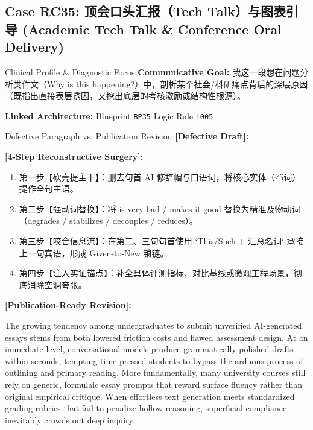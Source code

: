 \subsection{Case RC35: 顶会口头汇报（Tech Talk）与图表引导 (Academic Tech Talk \& Conference Oral Delivery)}\label{case:RC35}
\begin{ConceptBox}{Clinical Profile \& Diagnostic Focus}
\textbf{Communicative Goal:} 我这一段想在问题分析类作文（Why is this happening?）中，剖析某个社会/科研痛点背后的深层原因（既指出直接表层诱因，又挖出底层的考核激励或结构性根源）。\par
\textbf{Linked Architecture:} Blueprint \texttt{BP35} \enspace\textbar\enspace Logic Rule \texttt{L005}
\end{ConceptBox}
\begin{ExampleBox}{Defective Paragraph vs. Publication Revision}
\textbf{\color{TargetHighlight}[Defective Draft]:}\par
{}\par\vspace{6pt}
\textbf{\color{AcadForest}[4-Step Reconstructive Surgery]:}
\begin{enumerate}[label=\textbf{\color{AcadNavy}Step \arabic*:}, leftmargin=2em]
  \item 第一步【砍壳提主干】：删去句首 AI 修辞帽与口语词，将核心实体（≤5词）提作全句主语。
  \item 第二步【强动词替换】：将 is very bad / makes it good 替换为精准及物动词（degrades / stabilizes / decouples / reduces）。
  \item 第三步【咬合信息流】：在第二、三句句首使用 `This/Such + 汇总名词` 承接上一句宾语，形成 Given-to-New 锁链。
  \item 第四步【注入实证锚点】：补全具体评测指标、对比基线或微观工程场景，彻底消除空洞夸张。
\end{enumerate}\vspace{4pt}
\textbf{\color{AcadNavy}[Publication-Ready Revision]:}\par
The growing tendency among undergraduates to submit unverified AI-generated essays stems from both lowered friction costs and flawed assessment design. At an immediate level, conversational models produce grammatically polished drafts within seconds, tempting time-pressed students to bypass the arduous process of outlining and primary reading. More fundamentally, many university courses still rely on generic, formulaic essay prompts that reward surface fluency rather than original empirical critique. When effortless text generation meets standardized grading rubrics that fail to penalize hollow reasoning, superficial compliance inevitably crowds out deep inquiry.
\end{ExampleBox}
